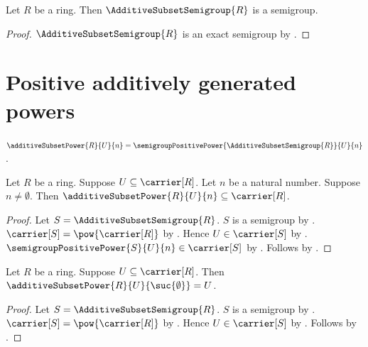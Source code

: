 \begin{classification}\label{additive_subset_semigroup_is_semigroup}
    Let $R$ be a ring.
    Then $\AdditiveSubsetSemigroup{R}$ is a semigroup.
\end{classification}
\begin{proof}
    $\AdditiveSubsetSemigroup{R}$ is an exact semigroup by
        .
\end{proof}

\section{Positive additively generated powers}

\begin{definition}\label{additive_subset_power}
    $\additiveSubsetPower{R}{U}{n}
        =\semigroupPositivePower{\AdditiveSubsetSemigroup{R}}{U}{n}$.
\end{definition}

\begin{proposition}\label{additive_subset_power_type}
    Let $R$ be a ring.
    Suppose $U\subseteq\carrier[R]$.
    Let $n$ be a natural number.
    Suppose $n\neq\emptyset$.
    Then $\additiveSubsetPower{R}{U}{n}\subseteq\carrier[R]$.
\end{proposition}
\begin{proof}
    Let $S=\AdditiveSubsetSemigroup{R}$.
    $S$ is a semigroup by .
    $\carrier[S]=\pow{\carrier[R]}$ by
        .
    Hence $U\in\carrier[S]$ by .
    $\semigroupPositivePower{S}{U}{n}\in\carrier[S]$ by
        .
    Follows by
        .
\end{proof}

\begin{proposition}\label{additive_subset_power_one}
    Let $R$ be a ring.
    Suppose $U\subseteq\carrier[R]$.
    Then $\additiveSubsetPower{R}{U}{\suc{\emptyset}}=U$.
\end{proposition}
\begin{proof}
    Let $S=\AdditiveSubsetSemigroup{R}$.
    $S$ is a semigroup by .
    $\carrier[S]=\pow{\carrier[R]}$ by
        .
    Hence $U\in\carrier[S]$ by .
    Follows by
        .
\end{proof}

